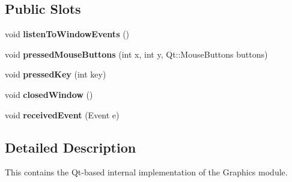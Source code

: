 \subsection*{Public Slots}
\begin{DoxyCompactItemize}
\item 
\hypertarget{group___graphics_internal_ga17e8cfdefacfb6fc452b7505a5ddad42}{void {\bfseries listen\-To\-Window\-Events} ()}\label{group___graphics_internal_ga17e8cfdefacfb6fc452b7505a5ddad42}

\item 
\hypertarget{group___graphics_internal_ga211d59c0a6baf6072e762c542472efe6}{void {\bfseries pressed\-Mouse\-Buttons} (int x, int y, Qt\-::\-Mouse\-Buttons buttons)}\label{group___graphics_internal_ga211d59c0a6baf6072e762c542472efe6}

\item 
\hypertarget{group___graphics_internal_gaf3120a375a321654553779cf030a9508}{void {\bfseries pressed\-Key} (int key)}\label{group___graphics_internal_gaf3120a375a321654553779cf030a9508}

\item 
\hypertarget{group___graphics_internal_gab4b152469c806312bcb7fbbbcbccb6dc}{void {\bfseries closed\-Window} ()}\label{group___graphics_internal_gab4b152469c806312bcb7fbbbcbccb6dc}

\item 
\hypertarget{group___graphics_internal_ga2ea8e392e6f4fcb9fdb5b76e7bb02953}{void {\bfseries received\-Event} (Event e)}\label{group___graphics_internal_ga2ea8e392e6f4fcb9fdb5b76e7bb02953}

\end{DoxyCompactItemize}


\subsection{Detailed Description}
This contains the Qt-\/based internal implementation of the Graphics module. 

